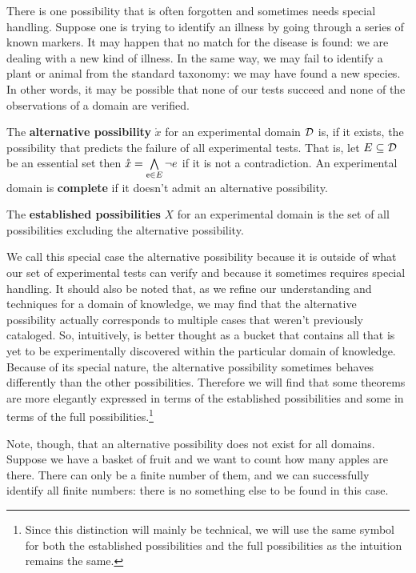 \documentclass[11pt,letterpaper,fleqn]{memoir} %
\begin{document}
There is one possibility that is often forgotten and sometimes needs special handling. Suppose one is trying to identify an illness by going through a series of known markers. It may happen that no match for the disease is found: we are dealing with a new kind of illness. In the same way, we may fail to identify a plant or animal from the standard taxonomy: we may have found a new species. In other words, it may be possible that none of our tests succeed and none of the observations of a domain are verified.

\begin{mathSection}
	\begin{prop}
		The \textbf{alternative possibility} $\mathring{x}$ for an experimental domain $\edomain$ is, if it exists, the possibility that predicts the failure of all experimental tests. That is, let $E \subseteq \edomain$ be an essential set then  $\mathring{x} = \bigAND\limits_{\stmt[e] \in E} \NOT e$ if it is not a contradiction. An experimental domain is \textbf{complete} if it doesn't admit an alternative possibility.
	\end{prop}

	\begin{prop}
	The \textbf{established possibilities} $X$ for an experimental domain is the set of all possibilities excluding the alternative possibility.
\end{prop}
\end{mathSection}

We call this special case the alternative possibility because it is outside of what our set of experimental tests can verify and because it sometimes requires special handling. It should also be noted that, as we refine our understanding and techniques for a domain of knowledge, we may find that the alternative possibility actually corresponds to multiple cases that weren't previously cataloged. So, intuitively, is better thought as a bucket that contains all that is yet to be experimentally discovered within the particular domain of knowledge. Because of its special nature, the alternative possibility sometimes behaves differently than the other possibilities. Therefore we will find that some theorems are more elegantly expressed in terms of the established possibilities and some in terms of the full possibilities.\footnote{Since this distinction will mainly be technical, we will use the same symbol for both the established possibilities and the full possibilities as the intuition remains the same.}

Note, though, that an alternative possibility does not exist for all domains. Suppose we have a basket of fruit and we want to count how many apples are there. There can only be a finite number of them, and we can successfully identify all finite numbers: there is no something else to be found in this case.
\end{document}
